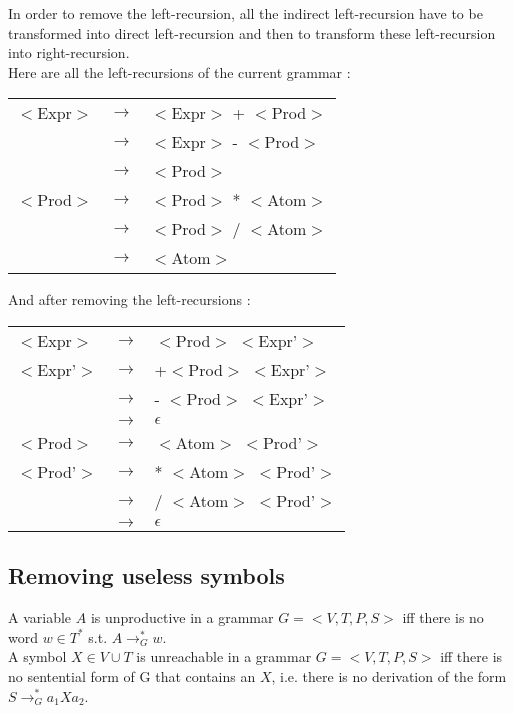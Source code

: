 \documentclass{article}
\begin{document}
\noindent In order to remove the left-recursion, all the indirect left-recursion have to be transformed into direct left-recursion and then to transform these left-recursion into right-recursion. \\
Here are all the left-recursions of the current grammar :
\begin{center}
\begin{tabular}{|m{2cm} m{0.5cm} m{4cm}|}
\hline
$<$Expr$>$ & $\to$ & $<$Expr$>$ + $<$Prod$>$\\
& $\to$ & $<$Expr$>$ - $<$Prod$>$\\
& $\to$ & $<$Prod$>$\\
$<$Prod$>$ & $\to$ &$<$Prod$>$ * $<$Atom$>$ \\
& $\to$ & $<$Prod$>$ / $<$Atom$>$ \\
& $\to$ & $<$Atom$>$\\

\hline
\end{tabular}
\end{center}

\noindent And after removing the left-recursions :

\begin{center}
\begin{tabular}{|m{2cm} m{0.5cm} m{4cm}|}
\hline

$<$Expr$>$ & $\to$ & $<$Prod$>$ $<$Expr'$>$\\
$<$Expr'$>$ & $\to$ & +$<$Prod$>$ $<$Expr'$>$\\
& $\to$ & - $<$Prod$>$ $<$Expr'$>$\\
& $\to$ & $\epsilon$\\
$<$Prod$>$ & $\to$ & $<$Atom$>$ $<$Prod'$>$ \\
$<$Prod'$>$ & $\to$ & * $<$Atom$>$ $<$Prod'$>$ \\
& $\to$ & / $<$Atom$>$ $<$Prod'$>$\\
& $\to$ & $\epsilon$\\

\hline
\end{tabular}
\end{center}

\subsection{Removing useless symbols}
A variable $A$ is unproductive in a grammar $G = <V,T,P,S>$ iff there is no word $w \in T^*$ s.t. $A \to_G^* w$. \\

\noindent A symbol $X \in V \cup T$ is unreachable in a grammar $G = <V,T,P,S>$ iff there is no sentential form of G that contains an $X$, i.e. there is no derivation of the form $S \to_G^* a_1 X a_2$. \\
\end{document}
